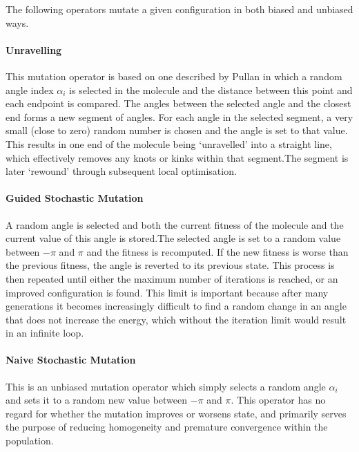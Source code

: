\documentclass{article}
\begin{document}
The following operators mutate a given configuration in both biased and
unbiased ways.

\paragraph{Unravelling}

This mutation operator is based on one described by Pullan \cite{PULLAN1998331}
in which a random angle index $\alpha_i$ is selected in the molecule and the
distance between this point and each endpoint is compared. The angles between
the selected angle and the closest end forms a new segment of angles. For each
angle in the selected segment, a very small (close to zero) random number is
chosen and the angle is set to that value. This results in one end of the
molecule being `unravelled' into a straight line, which effectively removes any
knots or kinks within that segment.The segment is later `rewound' through
subsequent local optimisation.

\paragraph{Guided Stochastic Mutation}


A random angle is selected and both the current fitness of the molecule and the
current value of this angle is stored.The selected angle is set to a random
value between $-\pi$ and $\pi$ and the fitness is recomputed. If the new fitness
is worse than the previous fitness, the angle is reverted to its previous state.
This process is then repeated until either the maximum number of iterations is
reached, or an improved configuration is found. This limit is important because
after many generations it becomes increasingly difficult to find a random change
in an angle that does not increase the energy, which without the iteration limit
would result in an infinite loop.

\paragraph{Naive Stochastic Mutation}

This is an unbiased mutation operator which simply selects a random angle
$\alpha_i$ and sets it to a random new value between $-\pi$ and $\pi$. This
operator has no regard for whether the mutation improves or worsens state, and
primarily serves the purpose of reducing homogeneity and premature convergence
within the population.
\end{document}
